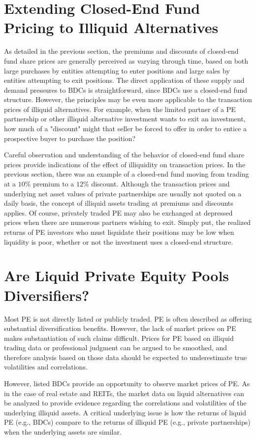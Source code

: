 \documentclass[11pt]{article}
\begin{document}
\section*{Extending Closed-End Fund Pricing to Illiquid Alternatives}
As detailed in the previous section, the premiums and discounts of closed-end fund share prices are generally perceived as varying through time, based on both large purchases by entities attempting to enter positions and large sales by entities attempting to exit positions. The direct application of these supply and demand pressures to BDCs is straightforward, since BDCs use a closed-end fund structure. However, the principles may be even more applicable to the transaction prices of illiquid alternatives. For example, when the limited partner of a PE partnership or other illiquid alternative investment wants to exit an investment, how much of a "discount" might that seller be forced to offer in order to entice a prospective buyer to purchase the position?

Careful observation and understanding of the behavior of closed-end fund share prices provide indications of the effect of illiquidity on transaction prices. In the previous section, there was an example of a closed-end fund moving from trading at a $10 \%$ premium to a $12 \%$ discount. Although the transaction prices and underlying net asset values of private partnerships are usually not quoted on a daily basis, the concept of illiquid assets trading at premiums and discounts applies. Of course, privately traded PE may also be exchanged at depressed prices when there are numerous partners wishing to exit. Simply put, the realized returns of PE investors who must liquidate their positions may be low when liquidity is poor, whether or not the investment uses a closed-end structure.

\section*{Are Liquid Private Equity Pools Diversifiers?}
Most PE is not directly listed or publicly traded. PE is often described as offering substantial diversification benefits. However, the lack of market prices on PE makes substantiation of such claims difficult. Prices for PE based on illiquid trading data or professional judgment can be argued to be smoothed, and therefore analysis based on those data should be expected to underestimate true volatilities and correlations.

However, listed BDCs provide an opportunity to observe market prices of PE. As in the case of real estate and REITs, the market data on liquid alternatives can be analyzed to provide evidence regarding the correlations and volatilities of the underlying illiquid assets. A critical underlying issue is how the returns of liquid PE (e.g., BDCs) compare to the returns of illiquid PE (e.g., private partnerships) when the underlying assets are similar.
\end{document}
